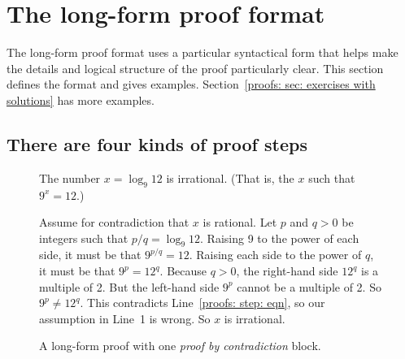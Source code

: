 \section{The long-form proof format}\label{proofs: sec: long form}

The long-form proof format uses a particular syntactical form
that helps make the details and logical structure of the proof particularly clear.
This section defines the format and gives examples.
Section~\ref{proofs: sec: exercises with solutions} has more examples.

\subsection{There are four kinds of proof steps}
\begin{figure}
  \begin{framed}\small
    \begin{theorem}\label{proofs: thm: first}
      The number  $x =\log_9 12$ is irrational. 
      (That is, the $x$ such that $9^x = 12$.)
    \end{theorem}
    \begin{longFormProof}
      \step Assume for contradiction that $x$ is rational.
      \step Let $p$ and $q>0$ be integers such that $p/q {} = \log_9 12$.
      \step Raising 9 to the power of each side, it must be that $9^{p/q} = 12$.
      \step\label{proofs: step: eqn}
      Raising each side to the power of $q$, it must be that $9^p = 12^q$.
      \step Because $q>0$, the right-hand side $12^q$ is a multiple of 2.
      \step But the left-hand side $9^p$ cannot be a multiple of 2.  So $9^p \ne 12^q$.
      \step\label{proofs: step: contr}
      This contradicts Line~\ref{proofs: step: eqn},  so our assumption in Line~1 is wrong.  So $x$ is irrational.
    \end{longFormProof}
    \vspace*{-10pt}
  \end{framed}
  \vspace*{-10pt}
  \caption{A long-form proof with one \emph{proof by contradiction} block.}\label{proofs: fig: contradiction}
  \vspace*{-5pt}
\end{figure}
